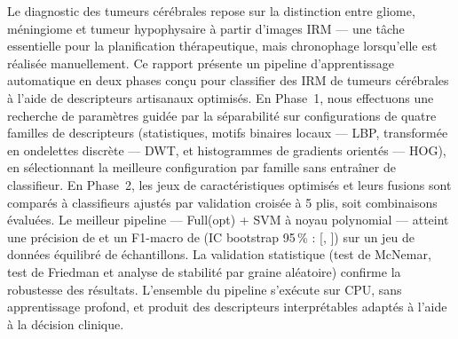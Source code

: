 Le diagnostic des tumeurs cérébrales repose sur la distinction entre gliome, méningiome
et tumeur hypophysaire à partir d'images IRM --- une tâche essentielle pour la planification
thérapeutique, mais chronophage lorsqu'elle est réalisée manuellement. Ce rapport présente
un pipeline d'apprentissage automatique en deux phases conçu pour classifier des IRM
de tumeurs cérébrales à l'aide de descripteurs artisanaux optimisés. En Phase~1, nous
effectuons une recherche de paramètres guidée par la séparabilité sur \NPhaseOneConfigs{}
configurations de quatre familles de descripteurs (statistiques, motifs binaires locaux
--- LBP, transformée en ondelettes discrète --- DWT, et histogrammes de gradients orientés
--- HOG), en sélectionnant la meilleure configuration par famille sans entraîner de
classifieur. En Phase~2, les jeux de caractéristiques optimisés et leurs fusions sont
comparés à \NModels{} classifieurs ajustés par validation croisée à 5 plis, soit
\NRuns{} combinaisons évaluées. Le meilleur pipeline --- Full(opt) + SVM à noyau
polynomial --- atteint une précision de \BestAcc{} et un F1-macro de \BestFOne{}
(IC bootstrap 95\,\% : [\BestFOneCILow, \BestFOneCIHigh]) sur un jeu de données
équilibré de \NTotal{} échantillons. La validation statistique (test de McNemar,
test de Friedman et analyse de stabilité par graine aléatoire) confirme la robustesse
des résultats. L'ensemble du pipeline s'exécute sur CPU, sans apprentissage profond,
et produit des descripteurs interprétables adaptés à l'aide à la décision clinique.
